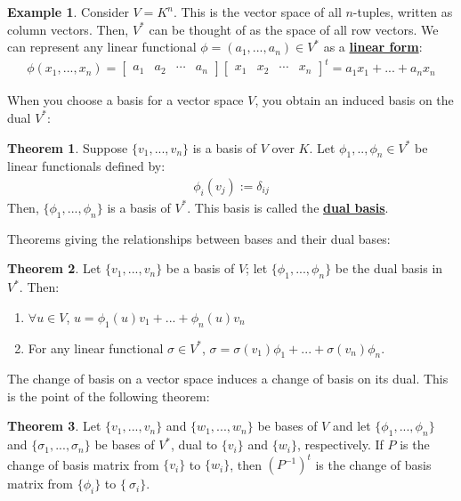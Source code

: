 \documentclass[11pt]{scrartcl}
\theoremstyle{definition}
\newtheorem{theorem}{Theorem}
\newtheorem{ex}{Example}
\theoremstyle{remark}
\newcommand{\dfn}[1]{\textbf{\underline{#1}}}
\begin{document}
{\begin{ex} 
Consider $V = K^n$. This is the vector space of all $n$-tuples, written as column vectors. Then, $V^*$ can be thought of as the space of all row vectors. We can represent any linear functional $\phi = (a_1, ..., a_n) \in V^*$ as a \dfn{linear form}: 
\begin{align*}
	\phi(x_1, ..., x_n) = \begin{bmatrix}
 	a_1 & a_2 & \cdots & a_n 	
 \end{bmatrix} \begin{bmatrix}
 	x_1 & x_2  & \cdots & x_n
 \end{bmatrix}^t = a_1 x_1 + ... + a_n x_n
\end{align*}	
\end{ex}

When you choose a basis for a vector space $V$, you obtain an induced basis on the dual $V^*$: 
\begin{theorem}
	Suppose $\{ v_1, ..., v_n \}$ is a basis of $V$ over $K$. Let $\phi_1 , .., \phi_n \in V^*$ be linear functionals defined by: 
	\begin{align}
		\phi_i(v_j) := \delta_{ij}	
	\end{align}
	Then, $\{ \phi_1, ..., \phi_n \}$ is a basis of $V^*$. This basis is called the \dfn{dual basis}. 
\end{theorem}

Theorems giving the relationships between bases and their dual bases: 
\begin{theorem}
	Let $\{ v_1, ..., v_n \}$ be a basis of $V$; let $\{ \phi_1 , ..., \phi_n \}$ be the dual basis in $V^*$. Then: 
	\begin{enumerate}[noitemsep]
		\item $\forall u \in V$, $u  = \phi_1(u)v_1 + ... + \phi_n(u) v_n$ 
		\item For any linear functional $\sigma \in V^*$, $\sigma = \sigma(v_1) \phi_1 + ... + \sigma(v_n) \phi_n$. 
	\end{enumerate}
\end{theorem}
	The change of basis on a vector space induces a change of basis on its dual. This is the point of the following theorem: 
\begin{theorem}
	Let $\{ v_1, ..., v_n \}$ and $\{ w_1, ..., w_n \}$ be bases of $V$ and let $\{ \phi_1, ... , \phi_n \}$ and $\{ \sigma_1, ..., \sigma_n \}$ be bases of $V^*$, dual to $\{ v_i \}$ and $\{ w_i \}$, respectively. If $P$ is the change of basis matrix from $\{ v_i \}$ to $\{w_i \}$, then $(P^{-1})^t$ is the change of basis matrix from $\{ \phi_i \}$ to $\{\ \sigma_i \}$. 
\end{theorem}

}
\end{document}
